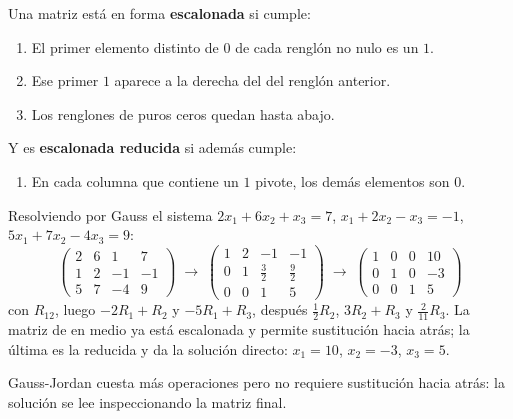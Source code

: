 \documentclass[11pt,letterpaper]{article}
\begin{document}
Una matriz está en forma \textbf{escalonada} si cumple:

\begin{enumerate}[label=\roman*., itemsep=0.1em]
    \item El primer elemento distinto de $0$ de cada renglón no nulo
          es un $1$.
    \item Ese primer $1$ aparece a la derecha del del renglón
          anterior.
    \item Los renglones de puros ceros quedan hasta abajo.
\end{enumerate}

Y es \textbf{escalonada reducida} si además cumple:

\begin{enumerate}[label=\roman*., start=4, itemsep=0.1em]
    \item En cada columna que contiene un $1$ pivote, los demás
          elementos son $0$.
\end{enumerate}

\begin{ejemplo}
  Resolviendo por Gauss el sistema
  $2x_1 + 6x_2 + x_3 = 7$, $x_1 + 2x_2 - x_3 = -1$,
  $5x_1 + 7x_2 - 4x_3 = 9$:
  \[
      \left(\begin{array}{ccc|c}
        2 & 6 & 1 & 7 \\ 1 & 2 & -1 & -1 \\ 5 & 7 & -4 & 9
      \end{array}\right)
      \;\longrightarrow\;
      \left(\begin{array}{ccc|c}
        1 & 2 & -1 & -1 \\
        0 & 1 & \tfrac{3}{2} & \tfrac{9}{2} \\
        0 & 0 & 1 & 5
      \end{array}\right)
      \;\longrightarrow\;
      \left(\begin{array}{ccc|c}
        1 & 0 & 0 & 10 \\ 0 & 1 & 0 & -3 \\ 0 & 0 & 1 & 5
      \end{array}\right)
  \]
  con $R_{12}$, luego $-2R_1 + R_2$ y $-5R_1 + R_3$, después
  $\tfrac{1}{2}R_2$, $3R_2 + R_3$ y $\tfrac{2}{11}R_3$. La matriz de
  en medio ya está escalonada y permite sustitución hacia atrás; la
  última es la reducida y da la solución directo:
  $x_1 = 10$, $x_2 = -3$, $x_3 = 5$.
\end{ejemplo}

\begin{idea}
  Gauss-Jordan cuesta más operaciones pero no requiere sustitución
  hacia atrás: la solución se lee inspeccionando la matriz final.
\end{idea}
\end{document}
